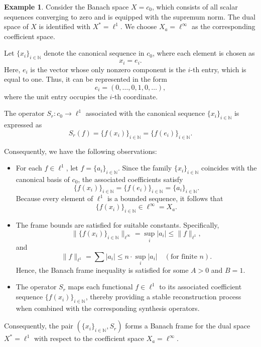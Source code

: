 \documentclass[12pt]{article}
\theoremstyle{definition}
\newtheorem{example}[theorem]{Example}
\theoremstyle{remark}
\begin{document}
\begin{example}
Consider the Banach space \(X=c_0\), which consists of all scalar sequences converging to zero and is equipped with the supremum norm. The dual space of \(X\) is identified with \(X^*=\ell^1\). We choose \(X_a=\ell^\infty\) as the corresponding coefficient space.

Let \(\{x_i\}_{i\in\mathbb{N}}\) denote the canonical sequence in \(c_0\), where each element is chosen as
\[
x_i=e_i .
\]
Here, \(e_i\) is the vector whose only nonzero component is the \(i\)-th entry, which is equal to one. Thus, it can be represented in the form
\[
e_i=(0,\ldots,0,1,0,\ldots),
\]
where the unit entry occupies the \(i\)-th coordinate.

The operator \(S_r:c_0\rightarrow\ell^1\) associated with the canonical sequence \(\{x_i\}_{i\in\mathbb{N}}\) is expressed as
\[
S_r(f)=\{f(x_i)\}_{i\in\mathbb{N}}=\{f(e_i)\}_{i\in\mathbb{N}}.
\]

Consequently, we have the following observations:

\begin{itemize}
  \item For each \(f\in\ell^1\), let \(f=\{a_i\}_{i\in\mathbb{N}}\). Since the family
  \(\{x_i\}_{i\in\mathbb{N}}\) coincides with the canonical basis of \(c_0\), the associated coefficients satisfy
  \[
  \{f(x_i)\}_{i\in\mathbb{N}}
  =
  \{f(e_i)\}_{i\in\mathbb{N}}
  =
  \{a_i\}_{i\in\mathbb{N}}.
  \]
  Because every element of \(\ell^1\) is a bounded sequence, it follows that
  \[
  \{f(x_i)\}_{i\in\mathbb{N}}\in\ell^\infty=X_a.
  \]

  \item The frame bounds are satisfied for suitable constants. Specifically,
  \[
  \| \{f(x_i)\}_{i\in\mathbb{N}} \|_{\ell^\infty}
  =
  \sup_i |a_i|
  \leq
  \|f\|_{\ell^1},
  \]
  and
  \[
  \|f\|_{\ell^1}
  =
  \sum |a_i|
  \leq
  n\cdot \sup_i |a_i|
  \quad (\text{for finite } n).
  \]
  Hence, the Banach frame inequality is satisfied for some \(A>0\) and \(B=1\).

  \item The operator \(S_r\) maps each functional \(f\in\ell^1\) to its associated coefficient sequence
  \(\{f(x_i)\}_{i\in\mathbb{N}}\), thereby providing a stable reconstruction process when combined with the corresponding synthesis operators.
\end{itemize}

Consequently, the pair \( (\{x_i\}_{i\in\mathbb{N}}, S_r) \) forms a Banach frame for the dual space \(X^*=\ell^1\) with respect to the coefficient space \(X_a=\ell^\infty\).
\end{example}
\end{document}

